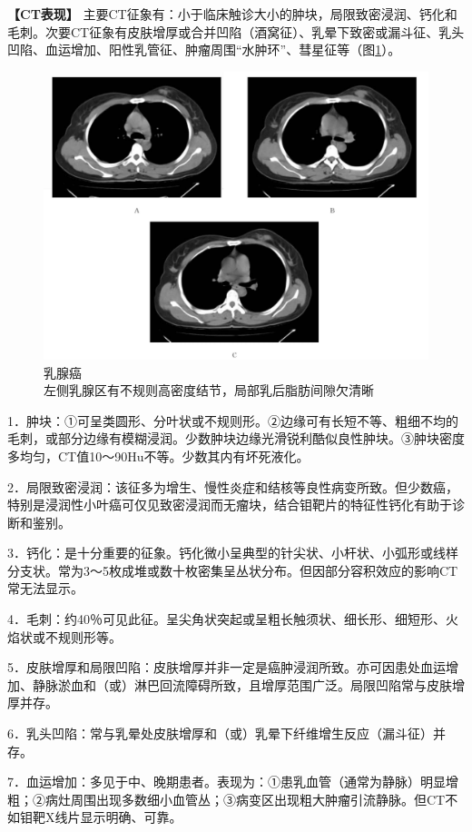 \textbf{【CT表现】}
主要CT征象有：小于临床触诊大小的肿块，局限致密浸润、钙化和毛刺。次要CT征象有皮肤增厚或合并凹陷（酒窝征）、乳晕下致密或漏斗征、乳头凹陷、血运增加、阳性乳管征、肿瘤周围“水肿环”、彗星征等（图\ref{fig9-50}）。

\begin{figure}[!htbp]
 \centering
 \includegraphics[width=.7\textwidth,height=\textheight,keepaspectratio]{./images/Image00248.jpg}
 \captionsetup{justification=centering}
 \caption{乳腺癌\\{\small 左侧乳腺区有不规则高密度结节，局部乳后脂肪间隙欠清晰}}
 \label{fig9-50}
  \end{figure} 

1．肿块：①可呈类圆形、分叶状或不规则形。②边缘可有长短不等、粗细不均的毛刺，或部分边缘有模糊浸润。少数肿块边缘光滑锐利酷似良性肿块。③肿块密度多均匀，CT值10～90Hu不等。少数其内有坏死液化。

2．局限致密浸润：该征多为增生、慢性炎症和结核等良性病变所致。但少数癌，特别是浸润性小叶癌可仅见致密浸润而无瘤块，结合钼靶片的特征性钙化有助于诊断和鉴别。

3．钙化：是十分重要的征象。钙化微小呈典型的针尖状、小杆状、小弧形或线样分支状。常为3～5枚成堆或数十枚密集呈丛状分布。但因部分容积效应的影响CT常无法显示。

4．毛刺：约40％可见此征。呈尖角状突起或呈粗长触须状、细长形、细短形、火焰状或不规则形等。

5．皮肤增厚和局限凹陷：皮肤增厚并非一定是癌肿浸润所致。亦可因患处血运增加、静脉淤血和（或）淋巴回流障碍所致，且增厚范围广泛。局限凹陷常与皮肤增厚并存。

6．乳头凹陷：常与乳晕处皮肤增厚和（或）乳晕下纤维增生反应（漏斗征）并存。

7．血运增加：多见于中、晚期患者。表现为：①患乳血管（通常为静脉）明显增粗；②病灶周围出现多数细小血管丛；③病变区出现粗大肿瘤引流静脉。但CT不如钼靶X线片显示明确、可靠。

